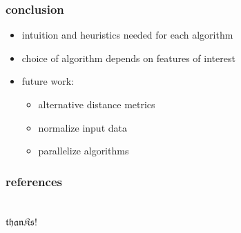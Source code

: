\begin{frame}
\frametitle{conclusion}

	\begin{itemize}
		\setlength{\itemindent}{3em}
		\item intuition and heuristics needed for each algorithm
		\item choice of algorithm depends on features of interest
		\item future work:
		\begin{itemize}
			\setlength{\itemindent}{3em}
			\item alternative distance metrics
			\item normalize input data
			\item parallelize algorithms
		\end{itemize}
	\end{itemize}

\end{frame}

\begin{frame}%

	\frametitle{references}
	
	

\end{frame}

\begingroup
{}
\begin{frame}[plain]

	\frametitle{}
	\centering\Huge\color{Red}
	\vfill
	~\\
	$\mathfrak{thanKs!}$
	\vfill

\end{frame}
\endgroup